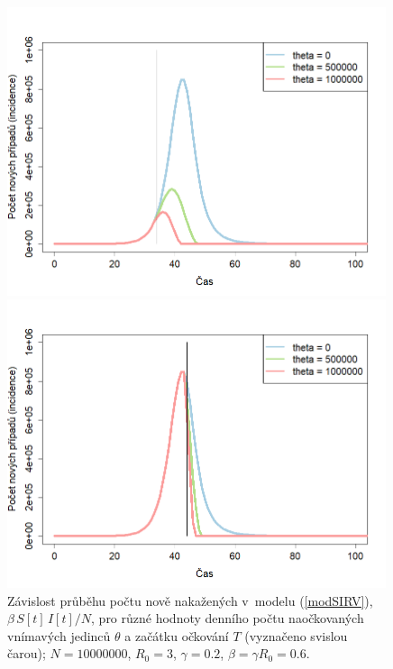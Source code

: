 \begin{figure}[ht]
	\begin{center}
		\begin{minipage}[m]{0.45\linewidth}
			\includegraphics[width=0.99\textwidth]{pic/epidemicSIRvacc1.png}
		\end{minipage}
		\hspace{2ex}
		\begin{minipage}[m]{0.45\linewidth}
			\includegraphics[width=0.99\textwidth]{pic/epidemicSIRvacc2.png}
		\end{minipage}
	\end{center}
	\caption{Závislost průběhu počtu nově nakažených v~modelu (\ref{modSIRV}), $\beta \, S[t]\,I[t]/N$, pro různé hodnoty denního počtu naočkovaných vnímavých jedinců $\theta$ a začátku očkování $T$ (vyznačeno svislou čarou); $N=10000000$, $R_0=3$, $\gamma=0.2$, $\beta=\gamma R_0=0.6$.}
	\label{SIRvacc}
\end{figure}

